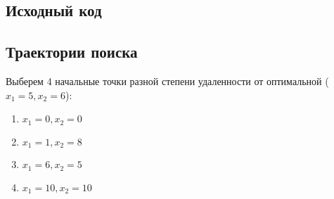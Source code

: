 \subsection{Исходный код}



\subsection{Траектории поиска}

Выберем 4 начальные точки разной степени удаленности от оптимальной ($x_1 = 5, x_2 = 6$):
\begin{multicols}{2} 
\begin{enumerate}
	\setlength{\itemsep}{0em}
	\item $x_1 = 0, x_2 = 0$
	\item $x_1 = 1, x_2 = 8$
	\item $x_1 = 6, x_2 = 5$
	\item $x_1 = 10, x_2 = 10$
\end{enumerate}
\end{multicols}

